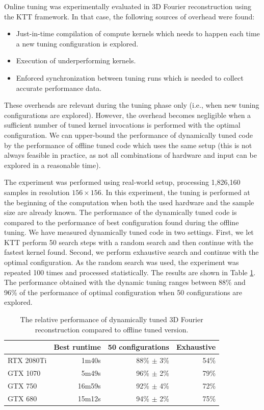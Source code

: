 \documentclass[
  digital,     %
  oneside,     %
  nosansbold,  %
  nocolorbold, %
  lof,         %
  lot,         %
  nocover
]{fithesis4}
\begin{document}
Online tuning was experimentally evaluated in 3D Fourier reconstruction using the KTT framework. In that case, the following sources of overhead were found:

\begin{itemize}
	\item Just-in-time compilation of compute kernels which needs to happen each time a new tuning configuration is explored.
	\item Execution of underperforming kernels.
	\item Enforced synchronization between tuning runs which is needed to collect accurate performance data.
\end{itemize}

These overheads are relevant during the tuning phase only (i.e., when new tuning configurations are explored). However, the overhead becomes negligible when a sufficient number of tuned kernel invocations is performed with the optimal configuration. We can upper-bound the performance of dynamically tuned code by the performance of offline tuned code which uses the same setup (this is not always feasible in practice, as not all combinations of hardware and input can be explored in a reasonable time).

The experiment was performed using real-world setup, processing 1,826,160 samples in resolution $156 \times 156$. In this experiment, the tuning is performed at the beginning of the computation when both the used hardware and the sample size are already known. The performance of the dynamically tuned code is compared to the performance of best configuration found during the offline tuning. We have measured dynamically tuned code in two settings. First, we let KTT perform 50 search steps with a random search and then continue with the fastest kernel found. Second, we perform exhaustive search and continue with the optimal configuration. As the random search was used, the experiment was repeated 100 times and processed statistically. The results are shown in Table \ref{fourier-dynamic}. The performance obtained with the dynamic tuning ranges between 88\% and 96\% of the performance of optimal configuration when 50 configurations are explored.

\begin{table}
	\centering
	\small
	\begin{tabular}{|l|r|r|r|}
		\hline
		& Best runtime & 50 configurations & Exhaustive\\
		\hline
		RTX 2080Ti & 1m40s  & 88\% $\pm$ 3\% & 54\% \\
		GTX 1070   & 5m49s  & 96\% $\pm$ 2\% & 79\% \\
		GTX 750    & 16m59s & 92\% $\pm$ 4\% & 72\% \\
		GTX 680	   & 15m12s & 94\% $\pm$ 2\% & 75\% \\
		\hline
	\end{tabular}
	\caption{The relative performance of dynamically tuned 3D Fourier reconstruction compared to offline tuned version.}
	\label{fourier-dynamic}
\end{table}
\end{document}
